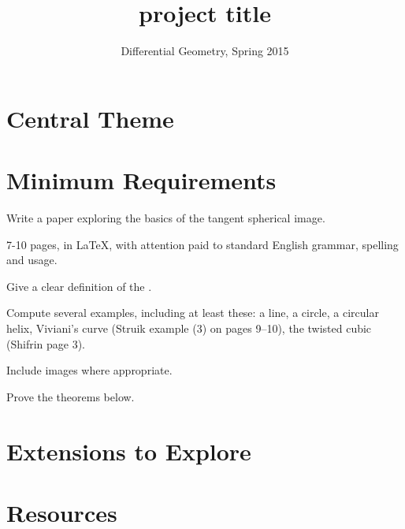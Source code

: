 \documentclass[12pt]{amsart}
\begin{document}
\title{project title}
\author{Differential Geometry, Spring 2015}

\maketitle

\section*{Central Theme}

\section*{Minimum Requirements}

Write a paper exploring the basics of the tangent spherical image. 
\begin{compactitem}
\item 7-10 pages, in \LaTeX, with attention paid to standard English grammar, spelling and usage.
\item Give a clear definition of the .
\item Compute several examples, including at least these: a line, a circle, a circular helix, Viviani's curve (Struik example (3) on pages 9--10), the twisted cubic (Shifrin page 3).
\item Include images where appropriate.
\item Prove the theorems below.
\end{compactitem}


\section*{Extensions to Explore}


\section*{Resources}
\end{document}
